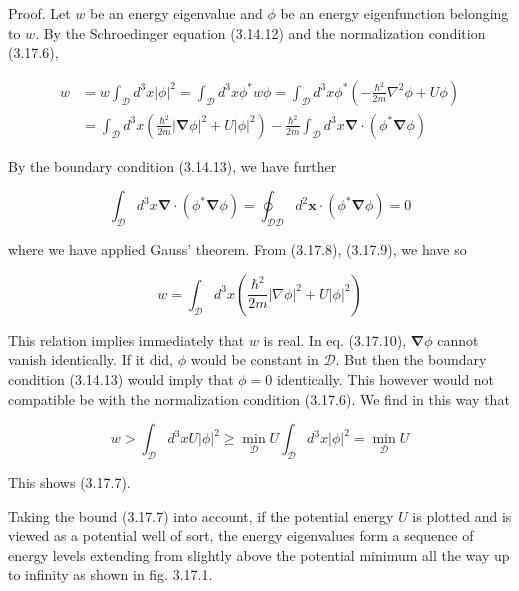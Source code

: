 \documentclass{article}
\begin{document}
Proof. Let $w$ be an energy eigenvalue and $\phi$ be an energy eigenfunction belonging to $w$. By the Schroedinger equation (3.14.12) and the normalization condition (3.17.6),
 
\begin{align*}
w & =w \int_{\mathcal{D}} d^{3} x|\phi|^{2}=\int_{\mathcal{D}} d^{3} x \phi^{*} w \phi=\int_{\mathcal{D}} d^{3} x \phi^{*}\left(-\frac{\hbar^{2}}{2 m} \nabla^{2} \phi+U \phi\right)  \tag{3.17.8}\\
& =\int_{\mathcal{D}} d^{3} x\left(\frac{\hbar^{2}}{2 m}|\boldsymbol{\nabla} \phi|^{2}+U|\phi|^{2}\right)-\frac{\hbar^{2}}{2 m} \int_{\mathcal{D}} d^{3} x \boldsymbol{\nabla} \cdot\left(\phi^{*} \boldsymbol{\nabla} \phi\right)
\end{align*}
 

By the boundary condition (3.14.13), we have further
 
\begin{equation*}
\int_{\mathcal{D}} d^{3} x \boldsymbol{\nabla} \cdot\left(\phi^{*} \boldsymbol{\nabla} \phi\right)=\oint_{\mathcal{D} \mathcal{D}} d^{2} \boldsymbol{x} \cdot\left(\phi^{*} \boldsymbol{\nabla} \phi\right)=0 \tag{3.17.9}
\end{equation*}
 
where we have applied Gauss' theorem. From (3.17.8), (3.17.9), we have so
 
\begin{equation*}
w=\int_{\mathcal{D}} d^{3} x\left(\frac{\hbar^{2}}{2 m}|\nabla \phi|^{2}+U|\phi|^{2}\right) \tag{3.17.10}
\end{equation*}
 

This relation implies immediately that $w$ is real.
In eq. (3.17.10), $\boldsymbol{\nabla} \phi$ cannot vanish identically. If it did, $\phi$ would be constant in $\mathcal{D}$. But then the boundary condition (3.14.13) would imply that $\phi=0$ identically. This however would not compatible be with the normalization condition (3.17.6). We find in this way that
 
\begin{equation*}
w>\int_{\mathcal{D}} d^{3} x U|\phi|^{2} \geq \min _{\mathcal{D}} U \int_{\mathcal{D}} d^{3} x|\phi|^{2}=\min _{\mathcal{D}} U \tag{3.17.11}
\end{equation*}
 

This shows (3.17.7).

Taking the bound (3.17.7) into account, if the potential energy $U$ is plotted and is viewed as a potential well of sort, the energy eigenvalues form a sequence of energy levels extending from slightly above the potential minimum all the way up to infinity as shown in fig. 3.17.1.
\end{document}
